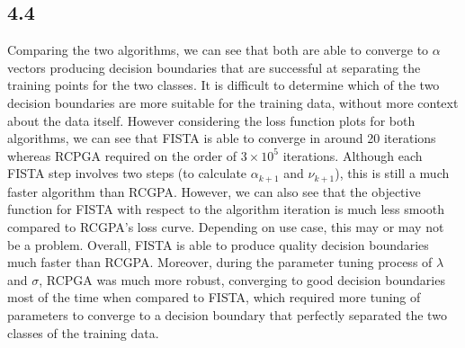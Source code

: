 \documentclass[12pt]{article}
\begin{document}
\subsection*{4.4}
Comparing the two algorithms, we can see that both are able to converge to $\alpha$ vectors producing decision boundaries that are successful at separating the training points for the two classes. It is difficult to determine which of the two decision boundaries are more suitable for the training data, without more context about the data itself. However considering the loss function plots for both algorithms, we can see that FISTA is able to converge in around 20 iterations whereas RCPGA required on the order of $3\times 10^{5}$ iterations. Although each FISTA step involves two steps (to calculate $\alpha_{k+1}$ and $\nu_{k+1}$), this is still a much faster algorithm than RCGPA. However, we can also see that the objective function for FISTA with respect to the algorithm iteration is much less smooth compared to RCGPA's loss curve. Depending on use case, this may or may not be a problem. Overall, FISTA is able to produce quality decision boundaries much faster than RCGPA. Moreover, during the parameter tuning process of $\lambda$ and $\sigma$, RCPGA was much more robust, converging to good decision boundaries most of the time when compared to FISTA, which required more tuning of parameters to converge to a decision boundary that perfectly separated the two classes of the training data.
\end{document}
